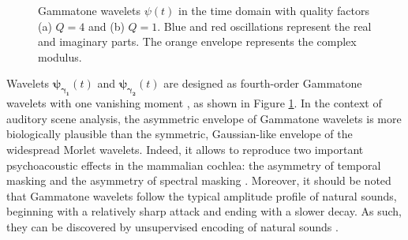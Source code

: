 \documentclass[journal]{IEEEtran}
\begin{document}
\begin{figure}
\begin{center}
\caption{
\label{fig:gammatones}
Gammatone wavelets $\psi(t)$ in the time domain with quality factors (a) $Q = 4$ and (b) $Q = 1$. Blue and red oscillations represent the real and imaginary parts. The orange envelope represents the complex modulus.}
\end{center}
\end{figure}

Wavelets
$\boldsymbol{\psi_{\gamma_1}}(t)$ and $\boldsymbol{\psi_{\gamma_2}}(t)$ are designed as fourth-order Gammatone
wavelets with one vanishing moment \cite{Venkitaraman2014}, as shown in Figure \ref{fig:gammatones}.
In the context of auditory scene analysis, the asymmetric envelope of Gammatone wavelets is more biologically plausible than the symmetric, Gaussian-like envelope of the widespread Morlet wavelets.
Indeed, it allows to reproduce two important psychoacoustic effects in the mammalian cochlea: the asymmetry of temporal masking and the asymmetry of spectral masking \cite{Fastl2007}.
Moreover, it should be noted that Gammatone wavelets follow the typical amplitude profile of natural sounds, beginning with a relatively sharp attack and ending with a slower decay.
As such, they can be discovered by unsupervised encoding of natural sounds \cite{Smith2006}.
\end{document}
